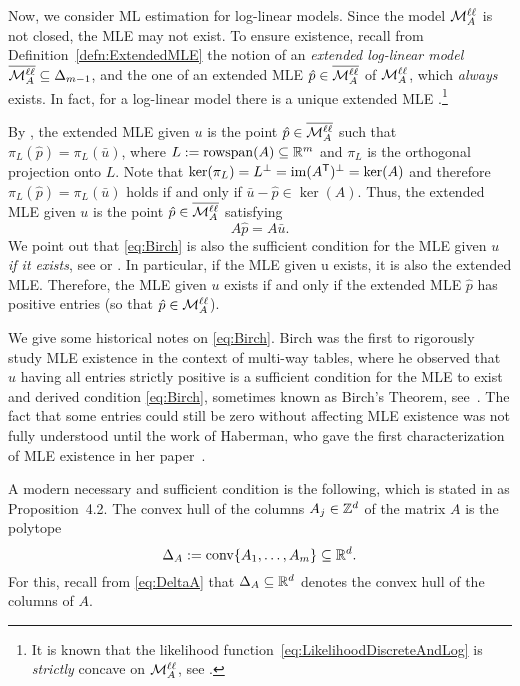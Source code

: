 Now, we consider ML estimation for log-linear models. Since the model $\mathcal{M}^{\mathtt{\ell \ell}}_A$ is not closed, the MLE may not exist. To ensure existence, recall from Definition~\ref{defn:ExtendedMLE} the notion of an \emph{extended log-linear model} $\overline{\mathcal{M}^{\mathtt{\ell \ell}}_A} \subseteq \Delta_{m-1}$, and the one of an extended MLE $\hat{p} \in \overline{\mathcal{M}^{\mathtt{\ell \ell}}_A}$ of $\mathcal{M}^{\mathtt{\ell \ell}}_A$, which \emph{always} exists. In fact, for a log-linear model there is a unique extended MLE \cite[Proposition~4.7]{LauritzenBook}.\footnote{It is known that the likelihood function~\eqref{eq:LikelihoodDiscreteAndLog} is \emph{strictly} concave on $\mathcal{M}^{\mathtt{\ell \ell}}_A$, see \cite[Corollary~7.3.8]{SullivantBook}.}

By \cite[Theorem~4.8]{LauritzenBook}, the extended MLE given $u$ is the point $\hat{p}  \in \overline{\mathcal{M}^{\mathtt{\ell \ell}}_A}$ such that $\pi_L(\hat{p}) = \pi_L(\bar{u})$, where $L := \operatorname{rowspan}(A) \subseteq \mathbb R^m$ and $\pi_L$ is the orthogonal projection onto $L$. Note that $\ker(\pi_L) = L^\perp = \operatorname{im}(A^{\mathsf{T}})^\perp = \ker(A)$ and therefore $\pi_L(\hat{p}) = \pi_L(\bar{u})$ holds if and only if $\bar{u} - \hat{p} \in \ker(A)$. Thus, the extended MLE given $u$ is the point $\hat{p} \in \overline{\mathcal{M}^{\mathtt{\ell \ell}}_A}$ satisfying
\begin{equation}\label{eq:Birch}
	A\hat{p}  = A\bar{u} .
\end{equation}
We point out that \eqref{eq:Birch} is also the sufficient condition for the MLE given $u$ \emph{if it exists},
see \cite[Proposition 2.1.5]{LecturesAlgebraicStatistics} or \cite[Corollary 7.3.9]{SullivantBook}. In particular, if the MLE given u exists, it is also the extended MLE. Therefore, the MLE given $u$ exists if and only if the extended MLE $\hat{p}$ has positive entries (so that $\hat{p} \in \mathcal{M}^{\mathtt{\ell \ell}}_A$).

We give some historical notes on \eqref{eq:Birch}.
Birch \cite{birch1963} was the first to rigorously study MLE existence in the context of multi-way tables, where he observed that $u$ having all entries strictly positive is a sufficient condition for the MLE to exist and derived condition \eqref{eq:Birch}, sometimes known as Birch's Theorem, see~\cite[Theorem 1.10]{ASCB}.
The fact that some entries could still be zero without affecting MLE existence was not fully understood until the work of Haberman, who gave the first characterization of MLE existence in her paper~\cite{haberman1974}.

A modern necessary and sufficient condition is the following, which is stated in \cite{DiscretePaper} as Proposition~4.2. 
The convex hull of the columns $A_j \in \mathbb Z^d$ of the matrix $A$ is the polytope
\begin{equation}\label{eq:DeltaA}
	\Delta_A := \operatorname{conv}\{ A_1, \ldots, A_m \}  \subseteq \mathbb R^d.
\end{equation}%
For this, recall from \eqref{eq:DeltaA} that $\Delta_A \subseteq \mathbb R^d$ denotes the convex hull of the columns of $A$.

